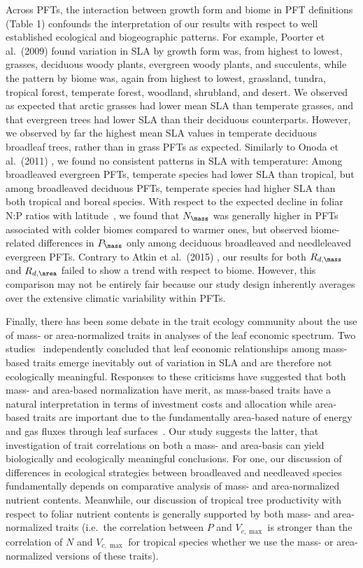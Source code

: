 Across PFTs, the interaction between growth form and biome in PFT definitions (Table 1) confounds the interpretation of our results with respect to well established ecological and biogeographic patterns.
For example, Poorter et al.~(2009) \nocite{poorter_causes_2009} found variation in SLA by growth form was, from highest to lowest, grasses, deciduous woody plants, evergreen woody plants, and succulents, while the pattern by biome was, again from highest to lowest, grassland, tundra, tropical forest, temperate forest, woodland, shrubland, and desert.
We observed as expected that arctic grasses had lower mean SLA than temperate grasses, and that evergreen trees had lower SLA than their deciduous counterparts.
However, we observed by far the highest mean SLA values in temperate deciduous broadleaf trees, rather than in grass PFTs as expected.
Similarly to Onoda et al.~(2011) \nocite{onoda_2011_global}, we found no consistent patterns in SLA with temperature:
Among broadleaved evergreen PFTs, temperate species had lower SLA than tropical, but among broadleaved deciduous PFTs, temperate species had higher SLA than both tropical and boreal species.
With respect to the expected decline in foliar N:P ratios with latitude~\cite{reich_global_2004}, we found that $N_{\mass}$ was generally higher in PFTs associated with colder biomes compared to warmer ones, but observed biome-related differences in $P_{\mass}$ only among deciduous broadleaved and needleleaved evergreen PFTs.
Contrary to Atkin et al.~(2015) \nocite{atkin_global_2015}, our results for both $R_{d,\mass}$ and $R_{d,\area}$ failed to show a trend with respect to biome.
However, this comparison may not be entirely fair because our study design inherently averages over the extensive climatic variability within PFTs.

Finally, there has been some debate in the trait ecology community about the use of mass- or area-normalized traits in analyses of the leaf economic spectrum.
Two studies~\cite{osnas_global_2013,lloyd_les} independently concluded that leaf economic relationships among mass-based traits emerge inevitably out of variation in SLA and are therefore not ecologically meaningful.
Responses to these criticisms have suggested that both mass- and area-based normalization have merit, as mass-based traits have a natural interpretation in terms of investment costs and allocation while area-based traits are important due to the fundamentally area-based nature of energy and gas fluxes through leaf surfaces~\cite{westoby_lloyd_response,poorter_les_response}.
Our study suggests the latter, that investigation of trait correlations on both a mass- and area-basis can yield biologically and ecologically meaningful conclusions.
For one, our discussion of differences in ecological strategies between broadleaved and needleaved species fundamentally depends on comparative analysis of mass- and area-normalized nutrient contents.
Meanwhile, our discussion of tropical tree productivity with respect to foliar nutrient contents is generally supported by both mass- and area-normalized traits (i.e.\ the correlation between $P$ and $V_{c,\max}$ is stronger than the correlation of $N$ and $V_{c,\max}$ for tropical species whether we use the mass- or area-normalized versions of these traits).


